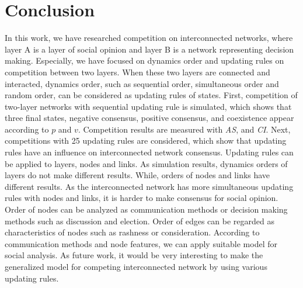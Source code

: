 \documentclass[review]{elsarticle}
\begin{document}
\section{Conclusion}
In this work, we have researched competition on interconnected networks, where layer A is a layer of social opinion and layer B is a network representing decision making.  Especially, we have focused on dynamics order and updating rules on competition between two layers. When these two layers are connected and interacted, dynamics order, such as sequential order, simultaneous order and random order, can be considered as updating rules of states. 
First, competition of two-layer networks with sequential updating rule is simulated, which shows that three final states, negative consensus, positive consensus, and coexistence appear according to $p$ and $v$. Competition results are measured with \textit{AS}, and \textit{CI}. Next, competitions with 25 updating rules are considered, which show that updating rules have an influence on interconnected network consensus. Updating rules can be applied to layers, nodes and links. As simulation results, dynamics orders of layers do not make different results. While, orders of nodes and links have different results. As the interconnected network has more simultaneous updating rules with nodes and links, it is harder to make consensus for social opinion. Order of nodes can be analyzed as communication methods or decision making methods such as discussion and election. Order of edges can be regarded as characteristics of nodes such as rashness or consideration. According to communication methods and node features, we can apply suitable model for social analysis. As future work, it would be very interesting to make the generalized model for competing interconnected network by using various updating rules. 


\end{document}
